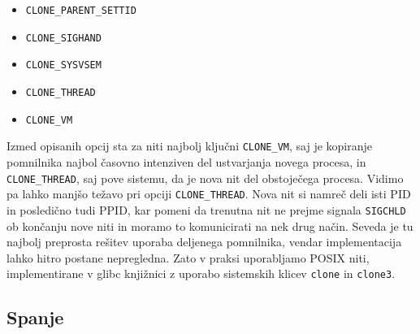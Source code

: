 \documentclass[a4paper,12pt,openright]{book}
\begin{document}
\begin{itemize}
\begin{description}
	      \end{description}
	\item \texttt{CLONE\_PARENT\_SETTID}
	\item \texttt{CLONE\_SIGHAND}
	\item \texttt{CLONE\_SYSVSEM}
	\item \texttt{CLONE\_THREAD}
	\item \texttt{CLONE\_VM}
\end{itemize}

Izmed opisanih opcij sta za niti najbolj ključni \texttt{CLONE\_VM}, saj je kopiranje pomnilnika najbol časovno intenziven del ustvarjanja novega procesa, in \texttt{CLONE\_THREAD}, saj pove sistemu, da je nova nit del obstoječega procesa.
Vidimo pa lahko manjšo težavo pri opciji \texttt{CLONE\_THREAD}.
Nova nit si namreč deli isti PID in posledično tudi PPID, kar pomeni da trenutna nit ne prejme signala \texttt{SIGCHLD} ob končanju nove niti in moramo to komunicirati na nek drug način.
Seveda je tu najbolj preprosta rešitev uporaba deljenega pomnilnika, vendar implementacija lahko hitro postane nepregledna.
Zato v praksi uporabljamo POSIX niti, implementirane v glibc knjižnici z uporabo sistemskih klicev \texttt{clone} in \texttt{clone3}.

\subsection{Spanje}
\end{document}
